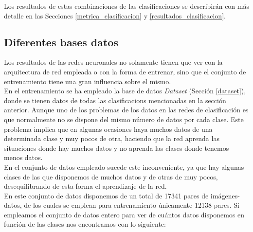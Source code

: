Los resultados de estas combinaciones de las clasificaciones se describirán con más detalle en las Secciones \ref{metrica_clasificacion} y \ref{resultados_clasificacion}.


\subsection{Diferentes bases datos}

Los resultados de las redes neuronales no solamente tienen que ver con la arquitectura de red empleada o con la forma de entrenar, sino que el conjunto de entrenamiento tiene una gran influencia sobre el mismo.\\

En el entrenamiento se ha empleado la base de datos \textit{Dataset} (Sección \ref{dataset}), donde se tienen datos de todas las clasificacions mencionadas en la sección anterior. Aunque uno de los problemas de los datos en las redes de clasificación es que normalmente no se dispone del mismo número de datos por cada clase. Este problema implica que en algunas ocasiones haya muchos datos de una determinada clase y muy pocos de otra, haciendo que la red aprenda las situaciones donde hay muchos datos y no aprenda las clases donde tenemos menos datos.\\

En el conjunto de datos empleado sucede este inconveniente, ya que hay algunas clases de las que disponemos de muchos datos y de otras de muy pocos, desequilibrando de esta forma el aprendizaje de la red.\\

En este conjunto de datos disponemos de un total de 17341 pares de imágenes-datos, de los cuales se emplean para entrenamiento únicamente 12138 pares. Si empleamos el conjunto de datos entero para ver de cuántos datos disponemos en función de las clases nos encontramos con lo siguiente:\\

